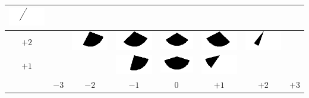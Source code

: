 \begin{tabular}{|c|c|c|c|c|c|c|c|}
	\includegraphics[width=0.045\linewidth]{img_Bereich/V1_vid_Winkel_X_3000_3000.png}\\ 
	\hline 
	$+2$ & &
	\includegraphics[width=0.045\linewidth]{img_Bereich/V1_vid_Winkel_X_-2000_2000.png}&
	\includegraphics[width=0.045\linewidth]{img_Bereich/V1_vid_Winkel_X_-1000_2000.png}&
	\includegraphics[width=0.045\linewidth]{img_Bereich/V1_vid_Winkel_X_0_2000.png}&
	\includegraphics[width=0.045\linewidth]{img_Bereich/V1_vid_Winkel_X_1000_2000.png}&
	\includegraphics[width=0.045\linewidth]{img_Bereich/V1_vid_Winkel_X_2000_2000.png}& \\ 
	\hline 
	$+1$ & & &
	\includegraphics[width=0.045\linewidth]{img_Bereich/V1_vid_Winkel_X_-1000_1000.png}&
	\includegraphics[width=0.045\linewidth]{img_Bereich/V1_vid_Winkel_X_0_1000.png}&
	\includegraphics[width=0.045\linewidth]{img_Bereich/V1_vid_Winkel_X_1000_1000.png}& &\\ 
	\hline 
	& $-3$& $-2$ & $-1$ &0& $+1$ & $+2$ & $+3$ \\ 
	\hline 
\end{tabular}